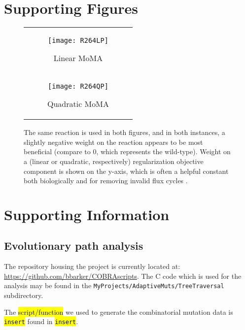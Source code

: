 \section{Supporting Figures}

\begin{figure}[H]
\centering
\begin{tabular}{c}
\begin{subfigure}[b]{\textwidth}
  \texttt{[image: R264LP]}
  \caption{Linear MoMA} 
  \label{fig:R264LP}
\end{subfigure}
\\
\begin{subfigure}[b]{\textwidth}
  \texttt{[image: R264QP]}
  \caption{Quadratic MoMA} 
  \label{fig:R264QP}
\end{subfigure}
\\
\end{tabular}
\caption{The same reaction is used in both figures, and in both
instances, a slightly negative weight on the reaction appears to be
most beneficial (compare to 0, which represents the wild-type).
Weight on a (linear or quadratic, respectively) 
regularization objective component is shown on the y-axis, which is often a helpful
constant both biologically and for removing invalid flux cycles 
\citep{Schuetz2012, Smallbone2009a}.}
\label{fig:wMoMA_smoothness}
\end{figure}

\section{Supporting Information}

\subsection{Evolutionary path analysis}
\label{sec:pathAnalysis}

The repository housing the project is currently located at:
\url{https://github.com/bbarker/COBRAscripts}. The C code which is
used for the analysis may be found in the
\texttt{MyProjects/AdaptiveMuts/TreeTraversal} subdirectory. 


The \hl{script/function} we used to generate the combinatorial
mutation data is \hl{\texttt{insert}} found in \hl{\texttt{insert}}.


